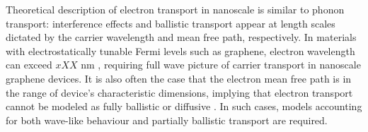 Theoretical description of electron transport in nanoscale is similar to phonon transport: interference effects and ballistic transport appear at length scales dictated by the carrier wavelength and mean free path, respectively. In materials with electrostatically tunable Fermi levels such as graphene, electron wavelength can exceed $xXX$ nm \cite{}, requiring full wave picture of carrier transport in nanoscale graphene devices. It is also often the case that the electron mean free path is in the range of device's characteristic dimensions, implying that electron transport cannot be modeled as fully ballistic or diffusive \cite{}. In such cases, models accounting for both wave-like behaviour and partially ballistic transport are required.









